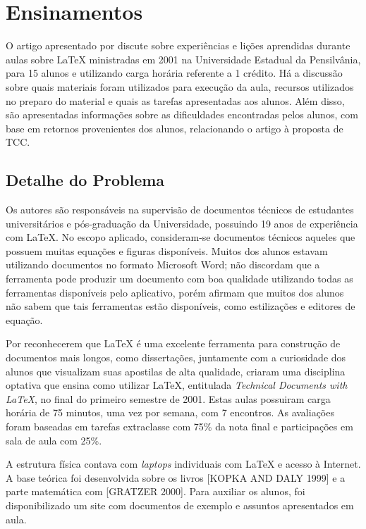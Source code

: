 \documentclass{article}
\begin{document}
\section{Ensinamentos}
\label{sec:ensin}

O artigo apresentado por \cite{gray2003} discute sobre experiências e lições
aprendidas durante aulas sobre \LaTeX{} ministradas em 2001 na Universidade
Estadual da Pensilvânia, para 15 alunos e utilizando carga horária referente a 1
crédito. Há a discussão sobre quais materiais foram utilizados para execução da
aula, recursos utilizados no preparo do material e quais as tarefas apresentadas
aos alunos. Além disso, são apresentadas informações sobre as dificuldades
encontradas pelos alunos, com base em retornos provenientes dos alunos,
relacionando o artigo à proposta de TCC.

\subsection{Detalhe do Problema}

Os autores são responsáveis na supervisão de documentos técnicos de estudantes
universitários e pós-graduação da Universidade, possuindo 19 anos de experiência
com \LaTeX{}. No escopo aplicado, consideram-se documentos técnicos aqueles que
possuem muitas equações e figuras disponíveis. Muitos dos alunos estavam
utilizando documentos no formato Microsoft Word\texttrademark{}; não discordam
que a ferramenta pode produzir um documento com boa qualidade utilizando todas
as ferramentas disponíveis pelo aplicativo, porém afirmam que muitos dos alunos
não sabem que tais ferramentas estão disponíveis, como estilizações e editores
de equação.

Por reconhecerem que \LaTeX{} é uma excelente ferramenta para construção de
documentos mais longos, como dissertações, juntamente com a curiosidade dos
alunos que visualizam suas apostilas de alta qualidade, criaram uma disciplina
optativa que ensina como utilizar \LaTeX{}, entitulada \textit{Technical
Documents with \LaTeX{}}, no final do primeiro semestre de 2001. Estas aulas
possuiram carga horária de 75 minutos, uma vez por semana, com 7 encontros. As
avaliações foram baseadas em tarefas extraclasse com 75\% da nota final e
participações em sala de aula com 25\%.

A estrutura física contava com \textit{laptops} individuais com \LaTeX{} e
acesso à Internet. A base teórica foi desenvolvida sobre os livros [KOPKA AND
DALY 1999] e a parte matemática com [GRATZER 2000]. Para auxiliar os alunos, foi
disponibilizado um site com documentos de exemplo e assuntos apresentados em
aula.
\end{document}
